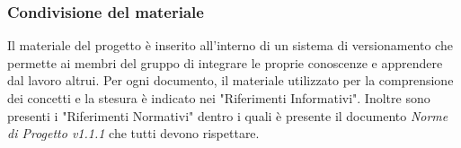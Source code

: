 		\subsubsection{Condivisione del materiale}
			Il materiale del progetto è inserito all'interno di un sistema di versionamento che permette ai membri del gruppo di integrare le proprie conoscenze e apprendere dal lavoro altrui.
			Per ogni documento, il materiale utilizzato per la comprensione dei concetti e la stesura è indicato nei "Riferimenti Informativi".
			Inoltre sono presenti i "Riferimenti Normativi" dentro i quali è presente il documento \textit{Norme di Progetto v1.1.1} che tutti devono rispettare.
